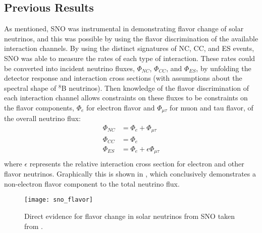 \subsection{Previous Results}

As mentioned, SNO was instrumental in demonstrating flavor change of solar neutrinos, and this was possible by using the flavor discrimination of the available interaction channels.
By using the distinct signatures of NC, CC, and ES events, SNO was able to measure the rates of each type of interaction.
These rates could be converted into incident neutrino fluxes, $\Phi_{NC}$, $\Phi_{CC}$, and $\Phi_{ES}$, by unfolding the detector response and interaction cross sections (with assumptions about the spectral shape of $^8$B neutrinos).
Then knowledge of the flavor discrimination of each interaction channel allows constraints on these fluxes to be constraints on the flavor components, $\Phi_e$ for electron flavor and $\Phi_{\mu\tau}$ for muon and tau flavor, of the overall neutrino flux:
\begin{equation}
\begin{split}
\Phi_{NC} &= \Phi_{e} + \Phi_{\mu\tau} \\
\Phi_{CC} &= \Phi_{e} \\
\Phi_{ES} &= \Phi_{e} + \epsilon \Phi_{\mu\tau} \\
\end{split}
\end{equation}
where $\epsilon$ represents the relative interaction cross section for electron and other flavor neutrinos.
Graphically this is shown in , which conclusively demonstrates a non-electron flavor component to the total neutrino flux.

\begin{figure}
\centering
\texttt{[image: sno\_flavor]}
\caption{\label{fig:sno_flavor} Direct evidence for flavor change in solar neutrinos from SNO taken from \cite{sno_direct}.}
\end{figure}

